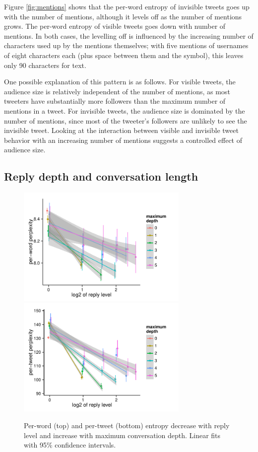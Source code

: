 \documentclass[11pt,letterpaper]{article}
\begin{document}
Figure \ref{fig:mentions} shows that the per-word entropy of invisible tweets goes up with the number of mentions, although it levels off as the number of mentions grows.  The per-word entropy of visible tweets goes down with number of mentions.  In both cases, the levelling off is influenced by the increasing number of characters used up by the mentions themselves; with five mentions of usernames of eight characters each (plus space between them and the \@ symbol), this leaves only 90 characters for text.

One possible explanation of this pattern is as follows. For visible tweets, the audience size is relatively independent of the number of mentions, as most tweeters have substantially more followers than the maximum number of mentions in a tweet.  For invisible tweets, the audience size is dominated by the number of mentions, since most of the tweeter's followers are unlikely to see the invisible tweet.  Looking at the interaction between visible and invisible tweet behavior with an increasing number of mentions suggests a controlled effect of audience size.

\subsection{Reply depth and conversation length}

\begin{figure}[t]
 \centering
  \includegraphics[width=3.25in]{figures/cmcl-rlevel-pw.pdf}
  \includegraphics[width=3.25in]{figures/cmcl-rlevel-pt.pdf}
 \caption{Per-word (top) and per-tweet (bottom) entropy decrease with reply level and increase with maximum conversation depth. Linear fits with 95\% confidence intervals.}\label{fig:rlevel-maxdesc}\vspace*{-.5em}
\end{figure}
\end{document}
